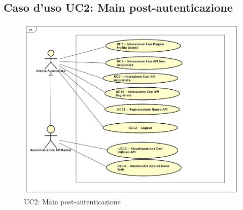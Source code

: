 \newpage
\subsection{Caso d'uso UC2:  Main post-autenticazione }
\label{UC2}
\begin{figure}[ht]
	\centering
	\includegraphics[scale=0.45]{UML/UC2.png}
	\caption{UC2: Main post-autenticazione}
\end{figure}

